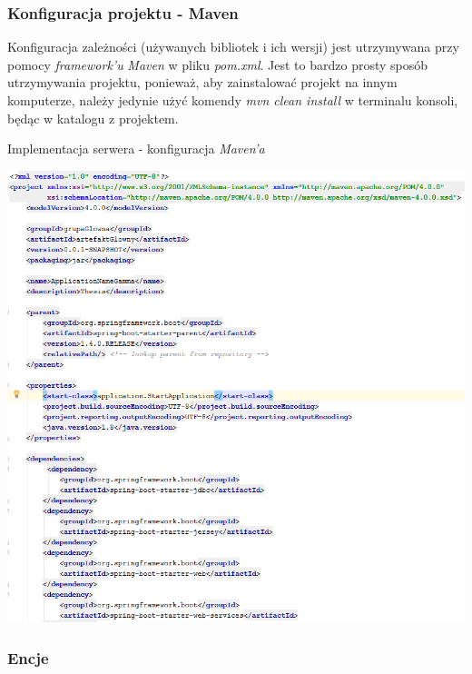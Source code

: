 \documentclass[10pt,titlepage]{article} %
\begin{document}

\subsubsection{Konfiguracja projektu - Maven}
Konfiguracja zależności (używanych bibliotek i ich wersji) jest utrzymywana przy pomocy \textit{framework'u} \textit{Maven} w pliku \textit{pom.xml}. Jest to bardzo prosty sposób utrzymywania projektu, ponieważ, aby zainstalować projekt na innym komputerze, należy jedynie użyć komendy \textit{mvn clean install} w terminalu konsoli, będąc w katalogu z projektem.
\begin{listing}[H]
\caption[Implementacja serwera - konfiguracja \textit{Maven'a} ]{Implementacja serwera - konfiguracja \textit{Maven'a}}
\includegraphics[width=1.0\textwidth, height=0.85\textheight ]{img/sekcja3/backend/konfiguracjaMaven}
\end{listing} 


\subsubsection{Encje}\label{Encje}
\end{document}
